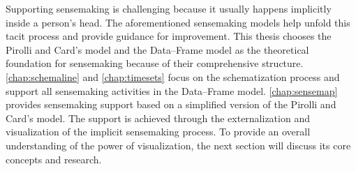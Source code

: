 Supporting sensemaking is challenging because it usually happens implicitly inside a person's head. The aforementioned sensemaking models help unfold this tacit process and provide guidance for improvement. This thesis chooses the Pirolli and Card's model and the Data--Frame model as the theoretical foundation for sensemaking because of their comprehensive structure. \autoref{chap:schemaline} and \autoref{chap:timesets} focus on the schematization process and support all sensemaking activities in the Data--Frame model. \autoref{chap:sensemap} provides sensemaking support based on a simplified version of the Pirolli and Card's model. The support is achieved through the externalization and visualization of the implicit sensemaking process. To provide an overall understanding of the power of visualization, the next section will discuss its core concepts and research.